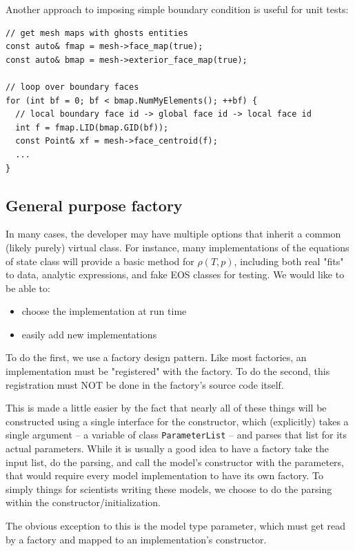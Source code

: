 Another approach to imposing simple boundary condition is useful for unit tests:

\begin{lstlisting}
// get mesh maps with ghosts entities
const auto& fmap = mesh->face_map(true);
const auto& bmap = mesh->exterior_face_map(true);

// loop over boundary faces
for (int bf = 0; bf < bmap.NumMyElements(); ++bf) {
  // local boundary face id -> global face id -> local face id
  int f = fmap.LID(bmap.GID(bf));
  const Point& xf = mesh->face_centroid(f);
  ...
}
\end{lstlisting}




\clearpage
\subsection{General purpose factory}
In many cases, the developer may have multiple options that inherit a
common (likely purely) virtual class.  
For instance, many implementations of the equations of state class will 
provide a basic method for $\rho(T,p)$,  including both real "fits" to 
data, analytic expressions, and fake EOS classes for testing. 
We would like to be able to:
\begin{itemize}
\item choose the implementation at run time
\item easily add new implementations
\end{itemize}

To do the first, we use a factory design pattern. 
Like most factories, an implementation must be "registered" with the factory.  
To do the second, this registration must NOT be done in the factory's source code itself.

This is made a little easier by the fact that nearly all of these things
will be constructed using a single interface for the constructor, which
(explicitly) takes a single argument -- a variable of class {\tt ParameterList} -- and
parses that list for its actual parameters.  While it is usually a good
idea to have a factory take the input list, do the parsing, and call the
model's constructor with the parameters, that would require every model
implementation to have its own factory.  To simply things for scientists
writing these models, we choose to do the parsing within the
constructor/initialization.

The obvious exception to this is the model type parameter, which must get
read by a factory and mapped to an implementation's constructor.

